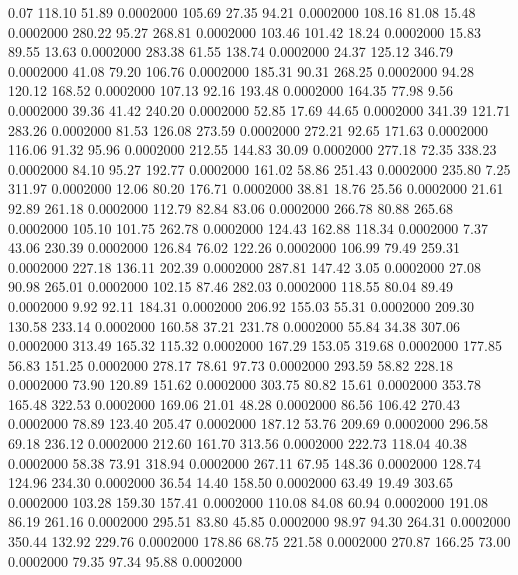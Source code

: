    0.07  118.10   51.89   0.0002000
 105.69   27.35   94.21   0.0002000
 108.16   81.08   15.48   0.0002000
 280.22   95.27  268.81   0.0002000
 103.46  101.42   18.24   0.0002000
  15.83   89.55   13.63   0.0002000
 283.38   61.55  138.74   0.0002000
  24.37  125.12  346.79   0.0002000
  41.08   79.20  106.76   0.0002000
 185.31   90.31  268.25   0.0002000
  94.28  120.12  168.52   0.0002000
 107.13   92.16  193.48   0.0002000
 164.35   77.98    9.56   0.0002000
  39.36   41.42  240.20   0.0002000
  52.85   17.69   44.65   0.0002000
 341.39  121.71  283.26   0.0002000
  81.53  126.08  273.59   0.0002000
 272.21   92.65  171.63   0.0002000
 116.06   91.32   95.96   0.0002000
 212.55  144.83   30.09   0.0002000
 277.18   72.35  338.23   0.0002000
  84.10   95.27  192.77   0.0002000
 161.02   58.86  251.43   0.0002000
 235.80    7.25  311.97   0.0002000
  12.06   80.20  176.71   0.0002000
  38.81   18.76   25.56   0.0002000
  21.61   92.89  261.18   0.0002000
 112.79   82.84   83.06   0.0002000
 266.78   80.88  265.68   0.0002000
 105.10  101.75  262.78   0.0002000
 124.43  162.88  118.34   0.0002000
   7.37   43.06  230.39   0.0002000
 126.84   76.02  122.26   0.0002000
 106.99   79.49  259.31   0.0002000
 227.18  136.11  202.39   0.0002000
 287.81  147.42    3.05   0.0002000
  27.08   90.98  265.01   0.0002000
 102.15   87.46  282.03   0.0002000
 118.55   80.04   89.49   0.0002000
   9.92   92.11  184.31   0.0002000
 206.92  155.03   55.31   0.0002000
 209.30  130.58  233.14   0.0002000
 160.58   37.21  231.78   0.0002000
  55.84   34.38  307.06   0.0002000
 313.49  165.32  115.32   0.0002000
 167.29  153.05  319.68   0.0002000
 177.85   56.83  151.25   0.0002000
 278.17   78.61   97.73   0.0002000
 293.59   58.82  228.18   0.0002000
  73.90  120.89  151.62   0.0002000
 303.75   80.82   15.61   0.0002000
 353.78  165.48  322.53   0.0002000
 169.06   21.01   48.28   0.0002000
  86.56  106.42  270.43   0.0002000
  78.89  123.40  205.47   0.0002000
 187.12   53.76  209.69   0.0002000
 296.58   69.18  236.12   0.0002000
 212.60  161.70  313.56   0.0002000
 222.73  118.04   40.38   0.0002000
  58.38   73.91  318.94   0.0002000
 267.11   67.95  148.36   0.0002000
 128.74  124.96  234.30   0.0002000
  36.54   14.40  158.50   0.0002000
  63.49   19.49  303.65   0.0002000
 103.28  159.30  157.41   0.0002000
 110.08   84.08   60.94   0.0002000
 191.08   86.19  261.16   0.0002000
 295.51   83.80   45.85   0.0002000
  98.97   94.30  264.31   0.0002000
 350.44  132.92  229.76   0.0002000
 178.86   68.75  221.58   0.0002000
 270.87  166.25   73.00   0.0002000
  79.35   97.34   95.88   0.0002000
